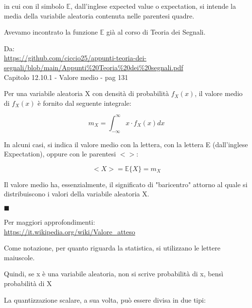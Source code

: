 in cui con il simbolo $\mathbb{E}$, dall'inglese expected value o expectation, si intende la media della variabile aleatoria contenuta nelle parentesi quadre. \newline 

\begin{tcolorbox}

    Avevamo incontrato la funzione $\mathbb{E}$ già al corso di Teoria dei Segnali. \newline 

    Da: \\
    \url{https://github.com/ciccio25/appunti-teoria-dei-segnali/blob/main/Appunti%20Teoria%20dei%20segnali.pdf} \\
    Capitolo 12.10.1 - Valore medio - pag 131 \newline 

    Per una variabile aleatoria X con densità di probabilità $f_X (x)$, il valore medio di $f_X (x)$ è fornito dal seguente integrale: 

{
    \Large 
    \begin{equation}
        m_X = \int_{- \infty}^{\infty} x \cdot f_X (x) dx
    \end{equation}
}

In alcuni casi, si indica il valore medio con la lettera, con la lettera E (dall'inglese Expectation), oppure con le parentesi $< >$: 

{
    \Large 
    \begin{equation}
        <X> = \mathbb{E}\{X\} = m_X
    \end{equation}
}

Il valore medio ha, essenzialmente, il significato di "baricentro" attorno al quale si distribuiscono i valori della variabile aleatoria X. \newline 

$\blacksquare$ \newline

Per maggiori approfondimenti: \\
\url{https://it.wikipedia.org/wiki/Valore_atteso} \newline 

    Come notazione, per quanto riguarda la statistica, si utilizzano le lettere maiuscole. \newline 

    Quindi, se x è una variabile aleatoria, non si scrive probabilità di x, bensì probabilità di X
\end{tcolorbox}

La quantizzazione scalare, a sua volta, può essere divisa in due tipi: 


